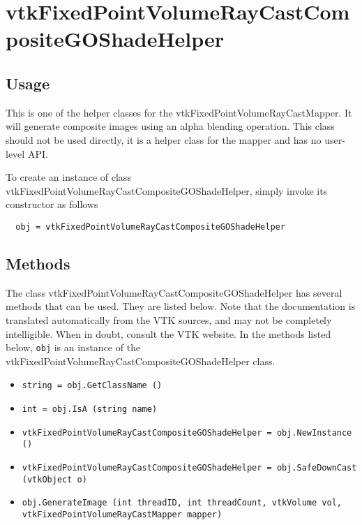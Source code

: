 \section{vtkFixedPointVolumeRayCastCompositeGOShadeHelper}

\subsection{Usage}

 This is one of the helper classes for the vtkFixedPointVolumeRayCastMapper. 
 It will generate composite images using an alpha blending operation.
 This class should not be used directly, it is a helper class for
 the mapper and has no user-level API.


To create an instance of class vtkFixedPointVolumeRayCastCompositeGOShadeHelper, simply
invoke its constructor as follows
\begin{verbatim}
  obj = vtkFixedPointVolumeRayCastCompositeGOShadeHelper
\end{verbatim}
\subsection{Methods}

The class vtkFixedPointVolumeRayCastCompositeGOShadeHelper has several methods that can be used.
  They are listed below.
Note that the documentation is translated automatically from the VTK sources,
and may not be completely intelligible.  When in doubt, consult the VTK website.
In the methods listed below, \verb|obj| is an instance of the vtkFixedPointVolumeRayCastCompositeGOShadeHelper class.
\begin{itemize}
\item  \verb|string = obj.GetClassName ()|

\item  \verb|int = obj.IsA (string name)|

\item  \verb|vtkFixedPointVolumeRayCastCompositeGOShadeHelper = obj.NewInstance ()|

\item  \verb|vtkFixedPointVolumeRayCastCompositeGOShadeHelper = obj.SafeDownCast (vtkObject o)|

\item  \verb|obj.GenerateImage (int threadID, int threadCount, vtkVolume vol, vtkFixedPointVolumeRayCastMapper mapper)|

\end{itemize}

